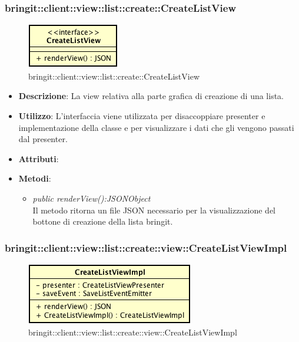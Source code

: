 \subsubsection{bringit::client::view::list::create::CreateListView}

\label{bringit::client::view::list::create::CreateListView}
\begin{figure}[H]
	\centering
	\includegraphics[scale=0.5]{Sezioni/SottosezioniST/img/app/CreateListView.png}
	\caption{bringit::client::view::list::create::CreateListView}
\end{figure}

\begin{itemize}
\item \textbf{Descrizione}: La view relativa alla parte grafica di creazione di una lista.
\item \textbf{Utilizzo}: L'interfaccia viene utilizzata per disaccoppiare presenter e implementazione della classe e per visualizzare i dati che gli vengono passati dal presenter.
\item \textbf{Attributi}: 
\item \textbf{Metodi}:
	\begin{itemize}
	\item \textit{public renderView():JSONObject}\\
	Il metodo ritorna un file JSON necessario per la visualizzazione del bottone di creazione della lista bringit.
	\end{itemize}
\end{itemize} 

\subsubsection{bringit::client::view::list::create::view::CreateListViewImpl}

\label{bringit::client::view::list::create::view::CreateListViewImpl}
\begin{figure}[H]
	\centering
	\includegraphics[scale=0.5]{Sezioni/SottosezioniST/img/app/CreateListViewImpl.png}
	\caption{bringit::client::view::list::create::view::CreateListViewImpl}
\end{figure}


